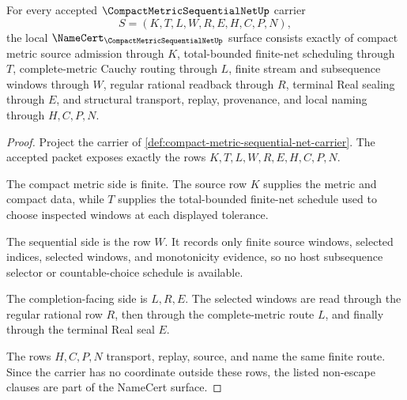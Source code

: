 \begin{theorem}
\label{thm:compact-metric-sequential-net-namecert-obligations}
For every accepted $\CompactMetricSequentialNetUp$ carrier
$$
S=(K,T,L,W,R,E,H,C,P,N),
$$
the local $\NameCert_{\CompactMetricSequentialNetUp}$ surface consists exactly of compact metric source admission through $K$, total-bounded finite-net scheduling through $T$, complete-metric Cauchy routing through $L$, finite stream and subsequence windows through $W$, regular rational readback through $R$, terminal Real sealing through $E$, and structural transport, replay, provenance, and local naming through $H,C,P,N$.
\end{theorem}
\begin{proof}
Project the carrier of \autoref{def:compact-metric-sequential-net-carrier}. The accepted packet exposes exactly the rows $K,T,L,W,R,E,H,C,P,N$.

The compact metric side is finite. The source row $K$ supplies the metric and compact data, while $T$ supplies the total-bounded finite-net schedule used to choose inspected windows at each displayed tolerance.

The sequential side is the row $W$. It records only finite source windows, selected indices, selected windows, and monotonicity evidence, so no host subsequence selector or countable-choice schedule is available.

The completion-facing side is $L,R,E$. The selected windows are read through the regular rational row $R$, then through the complete-metric route $L$, and finally through the terminal Real seal $E$.

The rows $H,C,P,N$ transport, replay, source, and name the same finite route. Since the carrier has no coordinate outside these rows, the listed non-escape clauses are part of the NameCert surface.
\end{proof}

